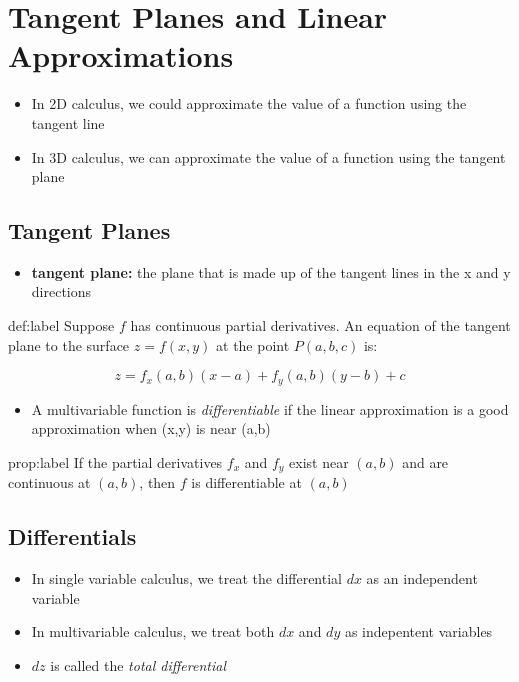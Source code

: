 \documentclass{package/notes}
\begin{document}
\section{Tangent Planes and Linear Approximations}

\begin{itemize}
	\item In 2D calculus, we could approximate the value of a function using the tangent line
	\item In 3D calculus, we can approximate the value of a function using the tangent plane
\end{itemize}

\subsection{Tangent Planes}

\begin{itemize}
	\item \textbf{tangent plane:} the plane that is made up of the tangent lines in the x and y directions
\end{itemize}

\begin{definition}{def:label}
	Suppose $f$ has continuous partial derivatives. An equation of the tangent plane to the surface $z = f(x,y)$ at the point $P(a,b,c)$ is:

	$$z = f_x(a,b)(x-a)+f_y(a,b)(y-b)+c$$
\end{definition}

\begin{itemize}
	\item A multivariable function is \textit{differentiable} if the linear approximation is a good approximation when (x,y) is near (a,b)
\end{itemize}

\begin{proposition}{prop:label}
	If the partial derivatives $f_x$ and $f_y$ exist near $(a,b)$ and are continuous at $(a,b)$, then $f$ is differentiable at $(a,b)$
\end{proposition}


\subsection{Differentials}

\begin{itemize}
	\item In single variable calculus, we treat the differential $dx$ as an independent variable
	\item In multivariable calculus, we treat both $dx$ and $dy$ as indepentent variables
	\item $dz$ is called the \textit{total differential}
\end{itemize}
\end{document}
